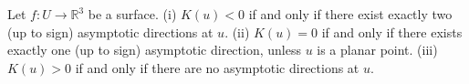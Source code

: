 Let $f: U \to \mathbb{R}^3$ be a surface.
(i) $K(u) < 0$ if and only if there exist exactly two (up to sign) asymptotic directions at $u$.
(ii) $K(u) = 0$ if and only if there exists exactly one (up to sign) asymptotic direction, unless $u$ is a planar point.
(iii) $K(u) > 0$ if and only if there are no asymptotic directions at $u$.